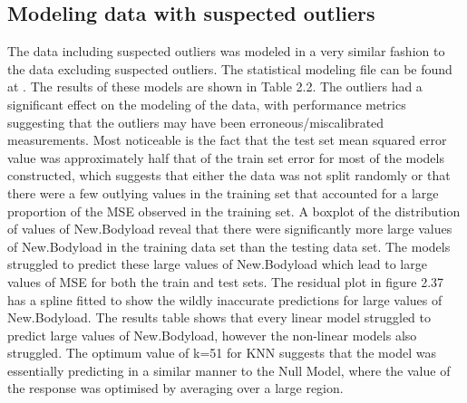 \subsection{Modeling data with suspected outliers}
The data including suspected outliers was modeled in a very similar fashion to the data excluding suspected outliers. The statistical modeling file can be found at \cite{ModellingWithoutOutliers}. The results of these models are shown in Table 2.2. The outliers had a significant effect on the modeling of the data, with performance metrics suggesting that the outliers may have been erroneous/miscalibrated measurements. Most noticeable is the fact that the test set mean squared error value was approximately half that of the train set error for most of the models constructed, which suggests that either the data was not split randomly or that there were a few outlying values in the training set that accounted for a large proportion of the MSE observed in the training set. A boxplot of the distribution of values of New.Bodyload reveal that there were significantly more large values of New.Bodyload in the training data set than the testing data set. The models struggled to predict these large values of New.Bodyload which lead to large values of MSE for both the train and test sets. The residual plot in figure 2.37 has a spline fitted to show the wildly inaccurate predictions for large values of New.Bodyload. The results table shows that every linear model struggled to predict large values of New.Bodyload, however the non-linear models also struggled. The optimum value of k=51 for KNN suggests that the model was essentially predicting in a similar manner to the Null Model, where the value of the response was optimised by averaging over a large region.

